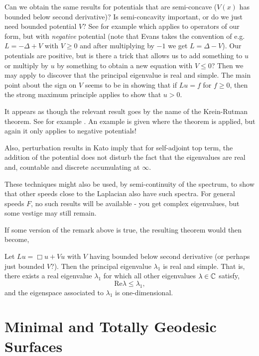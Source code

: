 \documentclass{amsart}
\begin{document}
\begin{rem}
Can we obtain the same results for potentials that are semi-concave (\(V(x)\) has bounded below second derivative)? Is semi-concavity important, or do we just need bounded potential \(V\)? See for example \cite[Theorem 6.5.3]{Evans:/1998} which applies to operators of our form, but with \emph{negative} potential (note that Evans takes the convention of e.g. \(L = -\Delta + V\) with \(V \geq 0\) and after multiplying by \(-1\) we get \(L = \Delta - V\)). Our potentials are positive, but is there a trick that allows us to add something to \(u\) or multiply by \(u\) by something to obtain a new equation with \(V \leq 0\)? Then we may apply \cite[Theorem 6.5.3]{Evans:/1998} to discover that the principal eigenvalue is real and simple. The main point about the sign on \(V\) seems to be in showing that if \(Lu = f\) for \(f \geq 0\), then the strong maximum principle applies to show that \(u > 0\).

It appears as though the relevant result goes by the name of the Krein-Rutman theorem. See for example \cite[Appendix C, Chapter 11]{smoller:/1983}. An example is given where the theorem is applied, but again it only applies to negative potentials!

Also, perturbation results in Kato imply that for self-adjoint top term, the addition of the potential does not disturb the fact that the eigenvalues are real and, countable and discrete accumulating at \(\infty\).

These techniques might also be used, by semi-continuity of the spectrum, to show that other speeds close to the Laplacian also have such spectra. For general speeds \(F\), no such results will be available - you get complex eigenvalues, but some vestige may still remain.
\end{rem}

If some version of the remark above is true, the resulting theorem would then become,
\begin{thm}
Let \(L u = \Box u + V u\) with \(V\) having bounded below second derivative (or perhaps just bounded \(V\)?). Then the principal eigenvalue \(\lambda_1\) is real and simple. That is, there exists a real eigenvalue \(\lambda_1\) for which all other eigenvalues \(\lambda \in \mathbb{C}\) satisfy,
\[
\text{Re} \lambda \leq \lambda_1,
\]
and the eigenspace associated to \(\lambda_1\) is one-dimensional.
\end{thm}


\section{Minimal and Totally Geodesic Surfaces}
\label{sec:minimal}
\end{document}

